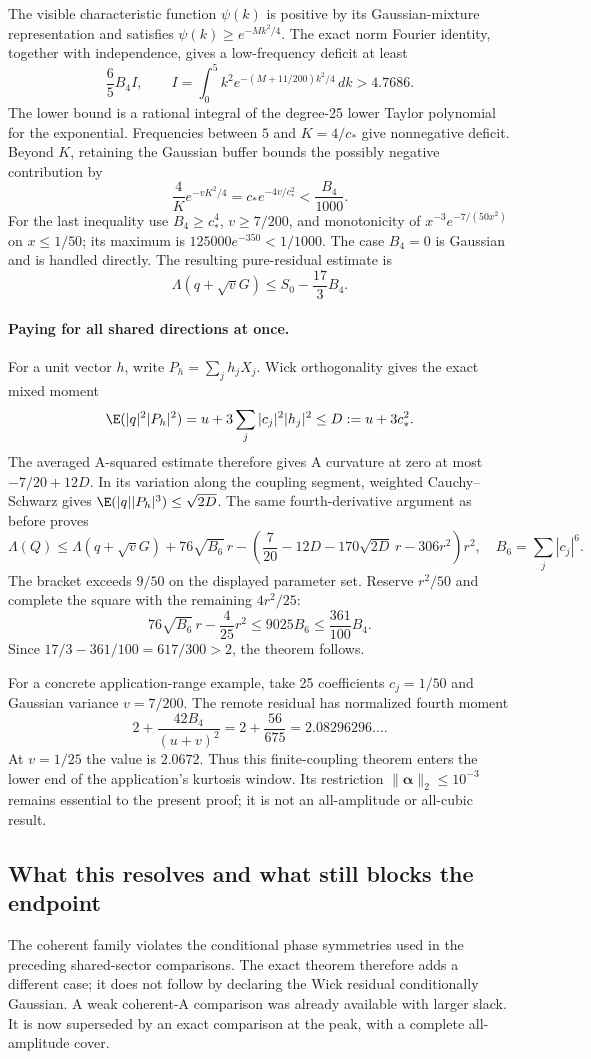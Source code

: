The visible characteristic function $\psi(k)$ is positive by its
Gaussian-mixture representation and satisfies
$\psi(k)\ge e^{-Mk^2/4}$. The exact norm Fourier identity, together
with independence, gives a low-frequency deficit at least
\[
 \frac65 B_4 I,\qquad
 I=\int_0^5 k^2e^{-(M+11/200)k^2/4}\,dk>4.7686.
\]
The lower bound is a rational integral of the degree-25 lower Taylor
polynomial for the exponential. Frequencies between $5$ and
$K=4/c_*$ give nonnegative deficit. Beyond $K$, retaining the
Gaussian buffer bounds the possibly negative contribution by
\[
 \frac4K e^{-vK^2/4}
 =c_*e^{-4v/c_*^2}<\frac{B_4}{1000}.
\]
For the last inequality use $B_4\ge c_*^4$, $v\ge7/200$, and
monotonicity of $x^{-3}e^{-7/(50x^2)}$ on $x\le1/50$; its maximum
is $125000e^{-350}<1/1000$. The case $B_4=0$ is Gaussian and is
handled directly. The resulting pure-residual estimate is
\[
 \Lambda(q+\sqrt vG)\le S_0-\frac{17}{3}B_4.
\]

\paragraph{Paying for all shared directions at once.}
For a unit vector $h$, write $P_h=\sum_jh_jX_j$. Wick orthogonality
gives the exact mixed moment
\[
 \E(|q|^2|P_h|^2)=u+3\sum_j|c_j|^2|h_j|^2
 \le D:=u+3c_*^2.
\]
The averaged A-squared estimate therefore gives A curvature at zero
at most $-7/20+12D$. In its variation along the coupling segment,
weighted Cauchy--Schwarz gives
$\E(|q||P_h|^3)\le\sqrt{2D}$. The same fourth-derivative argument
as before proves
\[
 \Lambda(Q)\le\Lambda(q+\sqrt vG)
 +76\sqrt{B_6}\,r
 -\left(\frac7{20}-12D-170\sqrt{2D}\,r-306r^2\right)r^2,
 \quad B_6=\sum_j|c_j|^6.
\]
The bracket exceeds $9/50$ on the displayed parameter set. Reserve
$r^2/50$ and complete the square with the remaining $4r^2/25$:
\[
 76\sqrt{B_6}\,r-\frac4{25}r^2\le9025B_6
 \le\frac{361}{100}B_4.
\]
Since $17/3-361/100=617/300>2$, the theorem follows.

For a concrete application-range example, take 25 coefficients
$c_j=1/50$ and Gaussian variance $v=7/200$. The remote residual has
normalized fourth moment
\[
 2+\frac{42B_4}{(u+v)^2}=2+\frac{56}{675}
 =2.08296296\ldots.
\]
At $v=1/25$ the value is $2.0672$. Thus this finite-coupling theorem
enters the lower end of the application's kurtosis window. Its
restriction $\|\boldsymbol\alpha\|_2\le10^{-3}$ remains essential to
the present proof; it is not an all-amplitude or all-cubic result.

\subsection{What this resolves and what still blocks the endpoint}
The coherent family violates the conditional phase symmetries used in
the preceding shared-sector comparisons. The exact theorem therefore
adds a different case; it does not follow by declaring the Wick residual
conditionally Gaussian. A weak coherent-A comparison was already
available with larger slack. It is now superseded by an exact comparison
at the peak, with a complete all-amplitude cover.


